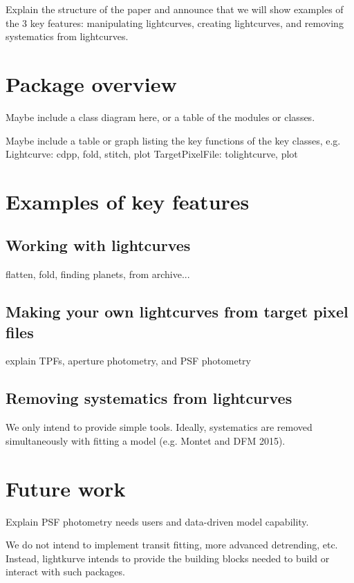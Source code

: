 \documentclass[twocolumn]{aastex62}
\begin{document}
Explain the structure of the paper and announce that we will show examples
of the 3 key features: manipulating lightcurves, creating lightcurves,
and removing systematics from lightcurves.

\section{Package overview}

Maybe include a class diagram here, or a table of the modules or classes.

Maybe include a table or graph listing the key functions of the key classes,
e.g.
Lightcurve: cdpp, fold, stitch, plot
TargetPixelFile: tolightcurve, plot


\section{Examples of key features}

\subsection{Working with lightcurves}

flatten, fold, finding planets, from archive...

\subsection{Making your own lightcurves from target pixel files}

explain TPFs, aperture photometry, and PSF photometry

\subsection{Removing systematics from lightcurves}

We only intend to provide simple tools.
Ideally, systematics are removed simultaneously with fitting a model (e.g. Montet and DFM 2015).

\section{Future work}

Explain PSF photometry needs users and data-driven model capability.

We do not intend to implement transit fitting, more advanced detrending, etc.
Instead, lightkurve intends to provide the building blocks needed to build
or interact with such packages.
\end{document}
